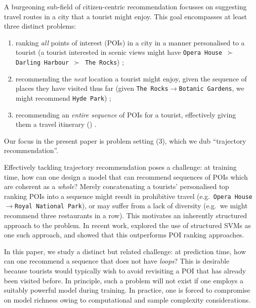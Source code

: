 
A burgeoning sub-field of citizen-centric recommendation focusses on suggesting travel routes in a city that a tourist might enjoy.
This goal encompasses at least three distinct problems:
\begin{enumerate}[(1)]
	\item ranking \emph{all} points of interest (POIs) in a city in a manner personalised to a tourist (\eg a tourist interested in scenic views might have {\tt Opera House $\succ$ Darling Harbour $\succ$ The Rocks}) \citep{shi2011personalized,lian2014geomf,hsieh2014mining,yuan2014graph};
	\item recommending the \emph{next} location a tourist might enjoy, given the sequence of places they have visited thus far (\eg given {\tt The Rocks$\to$Botanic Gardens}, we might recommend {\tt Hyde Park}) \citep{fpmc10,ijcai13,zhang2015location};
	\item recommending an \emph{entire sequence} of POIs for a tourist, effectively giving them a travel itinerary () \citep{lu2010photo2trip,ijcai15,lu2012personalized,gioniswsdm14,chen2015tripplanner}.
\end{enumerate}
Our focus in the present paper is problem setting (3), which we dub ``trajectory recommendation''.

Effectively tackling trajectory recommendation poses a challenge:
at training time, how can one design a model that can recommend sequences of POIs which are coherent as a \emph{whole}?
Merely concatenating a tourists' personalised top ranking POIs into a sequence
might result in prohibitive travel (e.g.\ {\tt Opera House$\to$Royal National Park}),
or may suffer from a lack of diversity (e.g.\ we might recommend three restaurants in a row).
This motivates an inherently structured approach to the problem.
In recent work, \citet{Chen:2017} explored the use of structured SVMs as one such approach, and showed that this outperforms POI ranking approaches. %

In this paper, we study a distinct but related challenge:
at prediction time, how can one recommend a sequence that does not have \emph{loops}?
This is desirable because tourists would typically wish to avoid revisiting a POI that has already been visited before.
In principle, such a problem will not exist if one employs a suitably powerful model during training.
In practice, one is forced to compromise on model richness owing to computational and sample complexity considerations.

